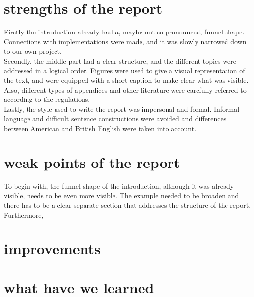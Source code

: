\documentclass{article}
\begin{document}

\section{strengths of the report}

Firstly the introduction already had a, maybe not so pronounced, funnel shape. Connections with implementations were made, and it was slowly narrowed down to our own project.
\\
Secondly, the middle part had a clear structure, and the different topics were addressed in a logical order. Figures were used to give a visual representation of the text, and were equipped with a short caption to make clear what was visible. Also, different types of appendices and other literature were carefully referred to according to the regulations.
\\
Lastly, the style used to write the report was impersonal and formal. Informal language and difficult sentence constructions were avoided and differences between American and British English were taken into account. 

\section{weak points of the report}

To begin with, the funnel shape of the introduction, although it was already visible, needs to be even more visible. The example needed to be broaden and there has to be a clear separate section that addresses the structure of the report.
\\
Furthermore, 

\section{improvements}

\section{what have we learned}
\end{document}
